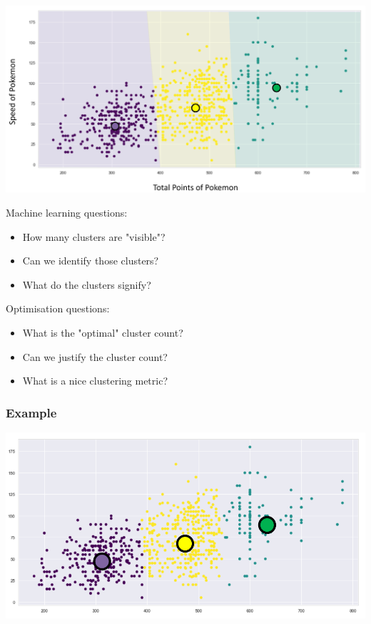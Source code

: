 \documentclass[11pt]{article}
\begin{document}
\begin{center}
\includegraphics[width=.9\linewidth]{./images/k-means-clustering-graph.png}
\end{center}

Machine learning questions:
\begin{itemize}
\item How many clusters are "visible"?
\item Can we identify those clusters?
\item What do the clusters signify?
\end{itemize}

Optimisation questions:
\begin{itemize}
\item What is the "optimal" cluster count?
\item Can we justify the cluster count?
\item What is a nice clustering metric?
\end{itemize}
\subsubsection{Example}
\label{sec:org00c5ab6}
\begin{center}
\includegraphics[width=.9\linewidth]{./images/k-means-clustering-example.png}
\end{center}
\end{document}
